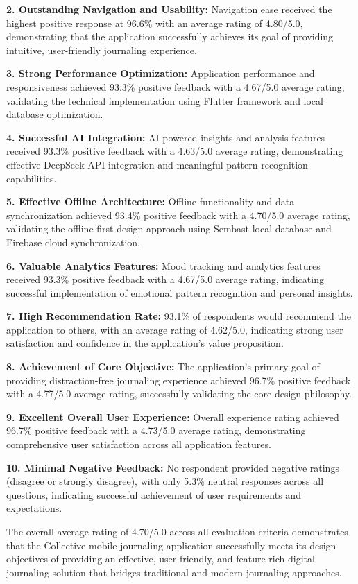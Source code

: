 \textbf{2. Outstanding Navigation and Usability:} Navigation ease received the highest positive response at 96.6\% with an average rating of 4.80/5.0, demonstrating that the application successfully achieves its goal of providing intuitive, user-friendly journaling experience.

\textbf{3. Strong Performance Optimization:} Application performance and responsiveness achieved 93.3\% positive feedback with a 4.67/5.0 average rating, validating the technical implementation using Flutter framework and local database optimization.

\textbf{4. Successful AI Integration:} AI-powered insights and analysis features received 93.3\% positive feedback with a 4.63/5.0 average rating, demonstrating effective DeepSeek API integration and meaningful pattern recognition capabilities.

\textbf{5. Effective Offline Architecture:} Offline functionality and data synchronization achieved 93.4\% positive feedback with a 4.70/5.0 average rating, validating the offline-first design approach using Sembast local database and Firebase cloud synchronization.

\textbf{6. Valuable Analytics Features:} Mood tracking and analytics features received 93.3\% positive feedback with a 4.67/5.0 average rating, indicating successful implementation of emotional pattern recognition and personal insights.

\textbf{7. High Recommendation Rate:} 93.1\% of respondents would recommend the application to others, with an average rating of 4.62/5.0, indicating strong user satisfaction and confidence in the application's value proposition.

\textbf{8. Achievement of Core Objective:} The application's primary goal of providing distraction-free journaling experience achieved 96.7\% positive feedback with a 4.77/5.0 average rating, successfully validating the core design philosophy.

\textbf{9. Excellent Overall User Experience:} Overall experience rating achieved 96.7\% positive feedback with a 4.73/5.0 average rating, demonstrating comprehensive user satisfaction across all application features.

\textbf{10. Minimal Negative Feedback:} No respondent provided negative ratings (disagree or strongly disagree), with only 5.3\% neutral responses across all questions, indicating successful achievement of user requirements and expectations.

The overall average rating of 4.70/5.0 across all evaluation criteria demonstrates that the Collective mobile journaling application successfully meets its design objectives of providing an effective, user-friendly, and feature-rich digital journaling solution that bridges traditional and modern journaling approaches.